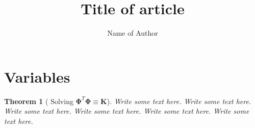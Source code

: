 \documentclass{article}
\title{Title of article}
\author{Name of Author}
\date{}
\theoremstyle{mystyle}
\newtheorem{theorem}{Theorem}[section]
\begin{document}
\maketitle



\section{Variables}


\begin{theorem}[%
Solving $\boldsymbol{\Phi}^{T}\boldsymbol{\Phi} \equiv \mathbf{K}$
]
Write some text here.
Write some text here.
Write some text here.
Write some text here.
Write some text here.
Write some text here.
\end{theorem}


%
%
\end{document}
